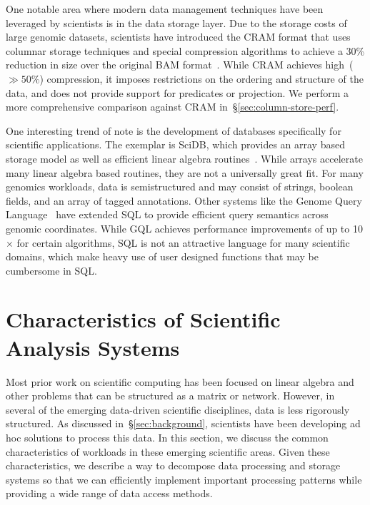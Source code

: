 \documentclass[10pt]{report} %
\begin{document}
One notable area where modern data management techniques have been leveraged by scientists is in
the data storage layer. Due to the storage costs of large genomic datasets, scientists have introduced the
CRAM format that uses columnar storage techniques and special compression algorithms to achieve a
30\% reduction in size over the original BAM format~\cite{fritz11}. While CRAM achieves high~($\gg 50\%$)
compression, it imposes restrictions on the ordering and structure of the data, and does not provide
support for predicates or projection. We perform a more comprehensive comparison against CRAM
in~\S\ref{sec:column-store-perf}.

One interesting trend of note is the development of databases specifically for scientific applications.
The exemplar is SciDB, which provides an array based storage model as well as efficient
linear algebra routines~\cite{brown10}. While arrays accelerate many linear algebra based routines, they
are not a universally great fit. For many genomics workloads, data is semistructured and may consist of
strings, boolean fields, and an array of tagged annotations. Other systems like the Genome Query
Language~\cite{kozanitis14} have extended SQL to provide efficient query semantics across genomic
coordinates. While GQL achieves performance improvements of up to 10$\times$ for certain algorithms,
SQL is not an attractive language for many scientific domains, which make heavy use of user designed
functions that may be cumbersome in SQL.

\pagebreak

\section{Characteristics of Scientific \\ Analysis Systems}
\label{sec:principles}

Most prior work on scientific computing has been focused on linear algebra and other problems that can
be structured as a matrix or network. However, in several of the emerging data-driven scientific
disciplines, data is less rigorously structured. As discussed
in~\S\ref{sec:background}, scientists have been developing ad hoc solutions to process this data. In this
section, we discuss the common characteristics of workloads in these emerging scientific areas. Given
these characteristics, we describe a way to decompose data processing and storage systems so that
we can efficiently implement important processing patterns while providing a wide range of data access
methods.
\end{document}
